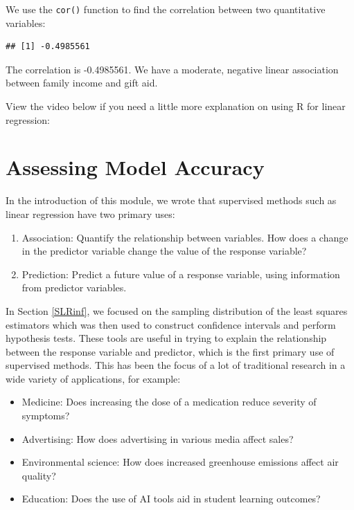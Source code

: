 \documentclass[
]{book}
\newenvironment{Shaded}{\begin{snugshade}}{\end{snugshade}}
\newcommand{\DocumentationTok}[1]{\textcolor[rgb]{0.56,0.35,0.01}{\textbf{\textit{#1}}}}
\newcommand{\FunctionTok}[1]{\textcolor[rgb]{0.13,0.29,0.53}{\textbf{#1}}}
\newcommand{\NormalTok}[1]{#1}
\newcommand{\SpecialCharTok}[1]{\textcolor[rgb]{0.81,0.36,0.00}{\textbf{#1}}}
\providecommand{\tightlist}{%
  \setlength{\itemsep}{0pt}\setlength{\parskip}{0pt}}
\begin{document}
We use the \texttt{cor()} function to find the correlation between two quantitative variables:

\begin{Shaded}
\end{Shaded}

\begin{verbatim}
## [1] -0.4985561
\end{verbatim}

The correlation is -0.4985561. We have a moderate, negative linear association between family income and gift aid.

View the video below if you need a little more explanation on using R for linear regression:

\hypertarget{SLRacc}{%
\section{Assessing Model Accuracy}\label{SLRacc}}

In the introduction of this module, we wrote that supervised methods such as linear regression have two primary uses:

\begin{enumerate}
\def\labelenumi{\arabic{enumi}.}
\tightlist
\item
  Association: Quantify the relationship between variables. How does a change in the predictor variable change the value of the response variable?
\item
  Prediction: Predict a future value of a response variable, using information from predictor variables.
\end{enumerate}

In Section \ref{SLRinf}, we focused on the sampling distribution of the least squares estimators which was then used to construct confidence intervals and perform hypothesis tests. These tools are useful in trying to explain the relationship between the response variable and predictor, which is the first primary use of supervised methods. This has been the focus of a lot of traditional research in a wide variety of applications, for example:

\begin{itemize}
\tightlist
\item
  Medicine: Does increasing the dose of a medication reduce severity of symptoms?
\item
  Advertising: How does advertising in various media affect sales?
\item
  Environmental science: How does increased greenhouse emissions affect air quality?
\item
  Education: Does the use of AI tools aid in student learning outcomes?
\end{itemize}
\end{document}
